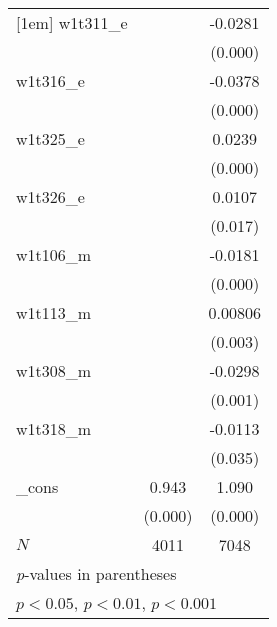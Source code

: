 {\begin{tabular}{l*{2}{c}}
[1em]
w1t311\_e    &                     &     -0.0281\sym{***}\\
            &                     &     (0.000)         \\
[1em]
w1t316\_e    &                     &     -0.0378\sym{***}\\
            &                     &     (0.000)         \\
[1em]
w1t325\_e    &                     &      0.0239\sym{***}\\
            &                     &     (0.000)         \\
[1em]
w1t326\_e    &                     &      0.0107\sym{*}  \\
            &                     &     (0.017)         \\
[1em]
w1t106\_m    &                     &     -0.0181\sym{***}\\
            &                     &     (0.000)         \\
[1em]
w1t113\_m    &                     &     0.00806\sym{**} \\
            &                     &     (0.003)         \\
[1em]
w1t308\_m    &                     &     -0.0298\sym{**} \\
            &                     &     (0.001)         \\
[1em]
w1t318\_m    &                     &     -0.0113\sym{*}  \\
            &                     &     (0.035)         \\
[1em]
\_cons      &       0.943\sym{***}&       1.090\sym{***}\\
            &     (0.000)         &     (0.000)         \\
\hline
\(N\)       &        4011         &        7048         \\
\hline\hline
\multicolumn{3}{l}{\footnotesize \textit{p}-values in parentheses}\\
\multicolumn{3}{l}{\footnotesize \sym{*} \(p<0.05\), \sym{**} \(p<0.01\), \sym{***} \(p<0.001\)}\\
\end{tabular}
}
